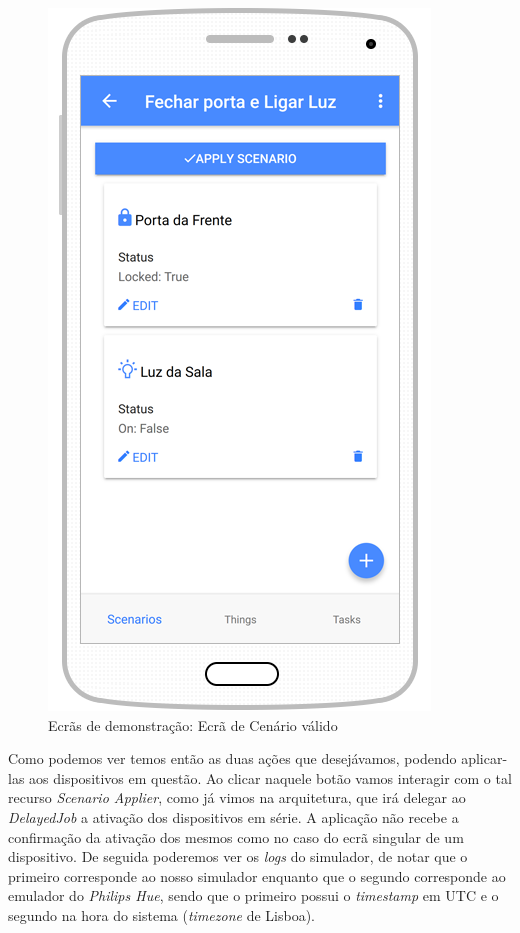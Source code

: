 \begin{figure}[H]
  \centering
        \includegraphics[scale=0.75]{img/demo/show_scenario_with_things.png}
  \caption{Ecrãs de demonstração: Ecrã de Cenário válido}
\end{figure}

Como podemos ver temos então as duas ações que desejávamos, podendo aplicar-las aos dispositivos em questão. Ao clicar naquele botão vamos interagir com o tal recurso \textit{Scenario Applier}, como já vimos na arquitetura, que irá delegar ao \textit{DelayedJob} a ativação dos dispositivos em série. A aplicação não recebe a confirmação da ativação dos mesmos como no caso do ecrã singular de um dispositivo. De seguida poderemos ver os \textit{logs} do simulador, de notar que o primeiro corresponde ao nosso simulador enquanto que o segundo corresponde ao emulador do \textit{Philips Hue}, sendo que o primeiro possui o \textit{timestamp} em UTC e o segundo na hora do sistema (\textit{timezone} de Lisboa).


